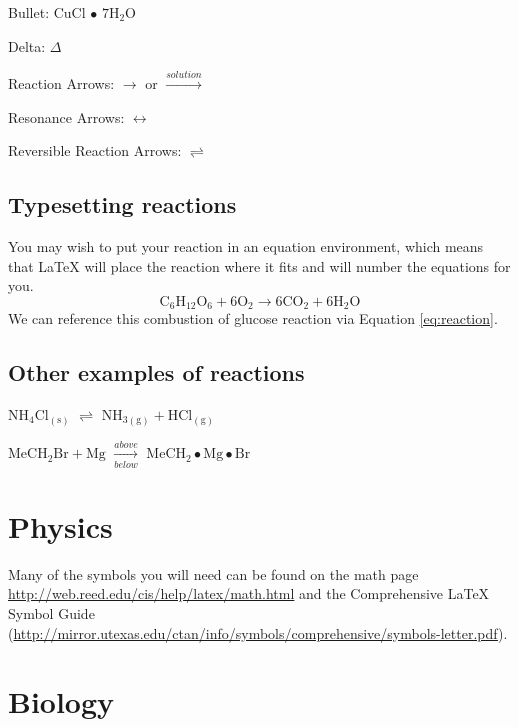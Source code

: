 \documentclass[12pt,twoside]{reedthesis}
\begin{document}
\noindent Bullet: CuCl \(\bullet\) \(\mathrm{7H_{2}O}\)

\noindent Delta: \(\Delta\)

\noindent Reaction Arrows: \(\longrightarrow\) or \(\xrightarrow{solution}\)

\noindent Resonance Arrows: \(\leftrightarrow\)

\noindent Reversible Reaction Arrows: \(\rightleftharpoons\)

\hypertarget{typesetting-reactions}{%
\subsection{Typesetting reactions}\label{typesetting-reactions}}

You may wish to put your reaction in an equation environment, which means that LaTeX will place the reaction where it fits and will number the equations for you.
\begin{equation}
  \mathrm{C_6H_{12}O_6  + 6O_2} \longrightarrow \mathrm{6CO_2 + 6H_2O}
  \label{eq:reaction}
\end{equation}
We can reference this combustion of glucose reaction via Equation \eqref{eq:reaction}.

\hypertarget{other-examples-of-reactions}{%
\subsection{Other examples of reactions}\label{other-examples-of-reactions}}

\(\mathrm{NH_4Cl_{(s)}}\) \(\rightleftharpoons\) \(\mathrm{NH_{3(g)}+HCl_{(g)}}\)

\noindent \(\mathrm{MeCH_2Br + Mg}\) \(\xrightarrow[below]{above}\) \(\mathrm{MeCH_2\bullet Mg \bullet Br}\)

\hypertarget{physics}{%
\section{Physics}\label{physics}}

Many of the symbols you will need can be found on the math page \url{http://web.reed.edu/cis/help/latex/math.html} and the Comprehensive LaTeX Symbol Guide (\url{http://mirror.utexas.edu/ctan/info/symbols/comprehensive/symbols-letter.pdf}).

\hypertarget{biology}{%
\section{Biology}\label{biology}}
\end{document}
